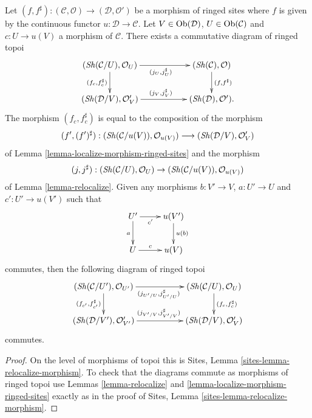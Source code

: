 \begin{lemma}
\label{lemma-relocalize-morphism-ringed-sites}
Let
$(f, f^\sharp) :
(\mathcal{C}, \mathcal{O})
\longrightarrow
(\mathcal{D}, \mathcal{O}')$
be a morphism of ringed sites where $f$ is given by the continuous
functor $u : \mathcal{D} \to \mathcal{C}$.
Let $V \in \mathop{\mathrm{Ob}}\nolimits(\mathcal{D})$, $U \in \mathop{\mathrm{Ob}}\nolimits(\mathcal{C})$
and $c : U \to u(V)$ a morphism of $\mathcal{C}$.
There exists a commutative diagram of ringed topoi
$$
\xymatrix{
(\Sh(\mathcal{C}/U), \mathcal{O}_U)
\ar[rr]_{(j_U, j_U^\sharp)} \ar[d]_{(f_c, f_c^\sharp)} & &
(\Sh(\mathcal{C}), \mathcal{O}) \ar[d]^{(f, f^\sharp)} \\
(\Sh(\mathcal{D}/V), \mathcal{O}'_V)
\ar[rr]^{(j_V, j_V^\sharp)} & &
(\Sh(\mathcal{D}), \mathcal{O}').
}
$$
The morphism $(f_c, f_c^\sharp)$
is equal to the composition of the morphism
$$
(f', (f')^\sharp) :
(\mathop{\mathit{Sh}}\nolimits(\mathcal{C}/u(V)), \mathcal{O}_{u(V)})
\longrightarrow
(\mathop{\mathit{Sh}}\nolimits(\mathcal{D}/V), \mathcal{O}'_V)
$$
of
Lemma \ref{lemma-localize-morphism-ringed-sites}
and the morphism
$$
(j, j^\sharp) :
(\mathop{\mathit{Sh}}\nolimits(\mathcal{C}/U), \mathcal{O}_U)
\to
(\mathop{\mathit{Sh}}\nolimits(\mathcal{C}/u(V)), \mathcal{O}_{u(V)})
$$
of
Lemma \ref{lemma-relocalize}.
Given any morphisms $b : V' \to V$, $a : U' \to U$ and
$c' : U' \to u(V')$ such that
$$
\xymatrix{
U' \ar[r]_-{c'} \ar[d]_a & u(V') \ar[d]^{u(b)} \\
U \ar[r]^-c & u(V)
}
$$
commutes, then the following diagram of ringed topoi
$$
\xymatrix{
(\Sh(\mathcal{C}/U'), \mathcal{O}_{U'})
\ar[rr]_{(j_{U'/U}, j_{U'/U}^\sharp)} \ar[d]_{(f_{c'}, f_{c'}^\sharp)} & &
(\Sh(\mathcal{C}/U), \mathcal{O}_U)
\ar[d]^{(f_c, f_c^\sharp)} \\
(\Sh(\mathcal{D}/V'), \mathcal{O}'_{V'})
\ar[rr]^{(j_{V'/V}, j_{V'/V}^\sharp)} & &
(\Sh(\mathcal{D}/V), \mathcal{O}'_V)
}
$$
commutes.
\end{lemma}

\begin{proof}
On the level of morphisms of topoi this is
Sites, Lemma \ref{sites-lemma-relocalize-morphism}.
To check that the diagrams commute as morphisms of ringed topoi use
Lemmas \ref{lemma-relocalize} and
\ref{lemma-localize-morphism-ringed-sites}
exactly as in the proof of
Sites, Lemma \ref{sites-lemma-relocalize-morphism}.
\end{proof}
















